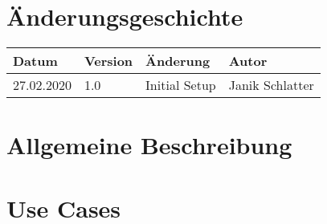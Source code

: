 \documentclass[
	ngerman,
	toc=listof, %
	toc=bibliography, %
	footnotes=multiple, %
	parskip=half, %
	numbers=noendperiod %
]{scrartcl}
\newcommand{\vorlagenOrdner}{../../99_Vorlagen} %
\begin{document}
\thispagestyle{plain}

\cleardoublepage


\section*{Änderungsgeschichte}
\begin{tabularx}{\textwidth}{llXl}
	\toprule
	Datum & Version & Änderung & Autor \\
	\midrule
	27.02.2020 & 1.0 & Initial Setup & Janik Schlatter \\
	\bottomrule
\end{tabularx}
\cleardoublepage

{}
\tableofcontents
\cleardoublepage

\let\stdsection\section
\renewcommand\section{\clearpage\stdsection}

\section{Allgemeine Beschreibung}

\section{Use Cases}
\end{document}
